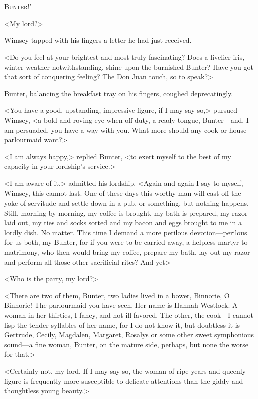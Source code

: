 \chapter[Chapter \thechapter]{}
\lettrine[ante=`]{B}{unter!}'

\zz
<My lord?>

\zz
Wimsey tapped with his fingers a letter he had just received.

\zz
<Do you feel at your brightest and most truly fascinating? Does a livelier iris, winter weather notwithstanding, shine upon the burnished Bunter? Have you got that sort of conquering feeling? The Don Juan touch, so to speak?>

Bunter, balancing the breakfast tray on his fingers, coughed deprecatingly.

<You have a good, upstanding, impressive figure, if I may say so,> pursued Wimsey, <a bold and roving eye when off duty, a ready tongue, Bunter—and, I am persuaded, you have a way with you. What more should any cook or house-parlourmaid want?>

<I am always happy,> replied Bunter, <to exert myself to the best of my capacity in your lordship's service.>

<I am aware of it,> admitted his lordship. <Again and again I say to myself, Wimsey, this cannot last. One of these days this worthy man will cast off the yoke of servitude and settle down in a pub. or something, but nothing happens. Still, morning by morning, my coffee is brought, my bath is prepared, my razor laid out, my ties and socks sorted and my bacon and eggs brought to me in a lordly dish. No matter. This time I demand a more perilous devotion—perilous for us both, my Bunter, for if you were to be carried away, a helpless martyr to matrimony, who then would bring my coffee, prepare my bath, lay out my razor and perform all those other sacrificial rites? And yet\longdash>

<Who is the party, my lord?>

<There are two of them, Bunter, two ladies lived in a bower, Binnorie, O Binnorie! The parlourmaid you have seen. Her name is Hannah Westlock. A woman in her thirties, I fancy, and not ill-favored. The other, the cook—I cannot lisp the tender syllables of her name, for I do not know it, but doubtless it is Gertrude, Cecily, Magdalen, Margaret, Rosalys or some other sweet symphonious sound—a fine woman, Bunter, on the mature side, perhaps, but none the worse for that.>

<Certainly not, my lord. If I may say so, the woman of ripe years and queenly figure is frequently more susceptible to delicate attentions than the giddy and thoughtless young beauty.>

